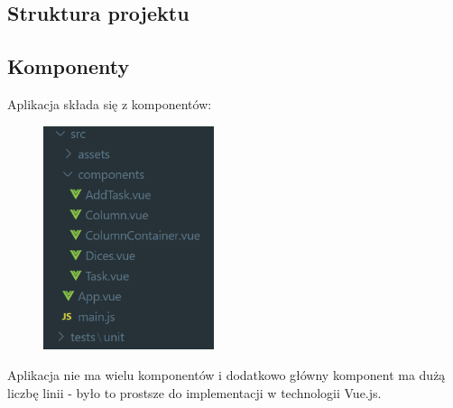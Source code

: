 \documentclass{article}
\begin{document}
\clearpage

\subsection{Struktura projektu}

\subsection{Komponenty}

Aplikacja składa się z komponentów:

\begin{figure} [hbt!]
    \includegraphics[width=5cm,center]{img/komponenty.PNG}
\end{figure}

Aplikacja nie ma wielu komponentów i dodatkowo główny komponent ma dużą liczbę linii - było to prostsze do implementacji w technologii Vue.js.
\end{document}
